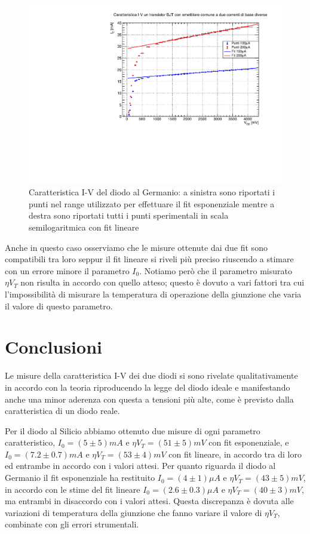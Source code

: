 \documentclass[]{article}
\begin{document}
	\begin{figure}[H]
		\centering
		\includegraphics[width=0.9\linewidth]{../c1}
		\caption{Caratteristica I-V del diodo al Germanio: a sinistra sono riportati i punti nel range utilizzato per effettuare il fit esponenziale mentre a destra sono riportati tutti i punti sperimentali in scala semilogaritmica con fit lineare}
		\label{fig:germanio}
	\end{figure}

Anche in questo caso osserviamo che le misure ottenute dai due fit sono compatibili tra loro seppur il fit lineare si riveli più preciso riuscendo a stimare con un errore minore il parametro $I_0$.
Notiamo però che il parametro misurato $\eta V_T$ non risulta in accordo con quello atteso; questo è dovuto a vari fattori tra cui l'impossibilità di misurare la temperatura di operazione della giunzione che varia il valore di questo parametro.
\section*{Conclusioni}
Le misure della caratteristica I-V dei due diodi si sono rivelate qualitativamente in accordo con la teoria riproducendo la legge del diodo ideale e manifestando anche una minor aderenza con questa a tensioni più alte, come è previsto dalla caratteristica di un diodo reale. 

Per il diodo al Silicio abbiamo ottenuto due misure di ogni parametro caratteristico, $I_0=(5\pm5)mA$ e $\eta V_T=(51\pm5)mV$ con fit esponenziale, e $I_0=(7.2\pm0.7)mA$ e $\eta V_T=(53\pm4)mV$ con fit lineare, in accordo tra di loro ed entrambe in accordo con i valori attesi. Per quanto riguarda il diodo al Germanio il fit esponenziale ha restituito $I_0=(4\pm1)\mu A$ e $\eta V_T=(43\pm5)mV$, in accordo con le stime del fit lineare $I_0=(2.6\pm0.3)\mu A$ e $\eta V_T=(40\pm3)mV$, ma entrambi in disaccordo con i valori attesi. Questa discrepanza è dovuta alle variazioni di temperatura della giunzione che fanno variare il valore di $\eta V_T$, combinate con gli errori strumentali.
\end{document}
